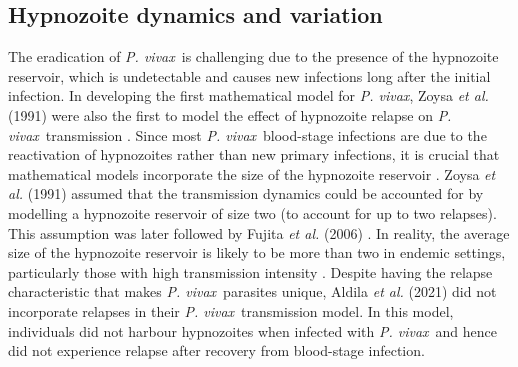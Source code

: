 \documentclass[12pt]{article}
\newcommand{\pv}{\textit{P. vivax}}
\newcommand{\etal}{\textit{et al. }}
\begin{document}
\subsection{Hypnozoite dynamics and variation}
The eradication of \pv~is challenging due to the presence of the hypnozoite reservoir, which is undetectable and causes new infections long after the initial infection. In developing the first mathematical model for \pv,  Zoysa \textit{et al.} (1991) were also the first to model the effect of hypnozoite relapse on \pv~transmission \cite{de1991mathematical}. Since most \pv~blood-stage infections are due to the reactivation of hypnozoites rather than new primary infections, it is crucial that mathematical models incorporate the size of the hypnozoite reservoir \cite{baird2008real, betuela2012relapses,commons2019risk, commons2018effect,luxemburger1999treatment}. Zoysa \textit{et al.} (1991) \cite{de1991mathematical} assumed that the transmission dynamics could be accounted for by modelling a hypnozoite reservoir of size two (to account for up to two relapses). This assumption was later followed by Fujita \etal (2006) \cite{fujita2006modeling}. In reality, the average size of the hypnozoite reservoir is likely to be more than two in endemic settings, particularly those with high transmission intensity \cite{white2016variation}. Despite having the relapse characteristic that makes \pv~parasites unique, Aldila \etal (2021) \cite{aldila2021superinfection} did not incorporate relapses in their \pv~transmission model. In this model, individuals did not harbour hypnozoites when infected with \pv~and hence did not experience relapse after recovery from blood-stage infection.
\end{document}
